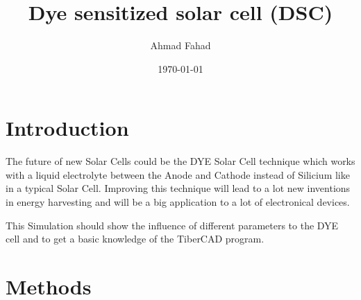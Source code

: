 \documentclass[%
 reprint,
 superscriptaddress,
 amsmath,amssymb,
pra,
]{revtex4-1}
\begin{document}

\title{Dye sensitized solar cell (DSC)}

\author{Ahmad Fahad}
%

\date{\today}%

\begin{abstract}
\end{abstract}

\maketitle



\section{Introduction}
\label{sec:introduction}

The future of new Solar Cells could be the DYE Solar Cell technique which works with a liquid electrolyte between the Anode and Cathode instead of Silicium like in a typical Solar Cell. Improving this technique will lead to a lot new inventions in energy harvesting and will be a big application to a lot of electronical devices.

This Simulation should show the influence of different parameters to the DYE cell and to get a basic knowledge of the TiberCAD program.

\section{Methods}
\label{sec:methods}
\end{document}
